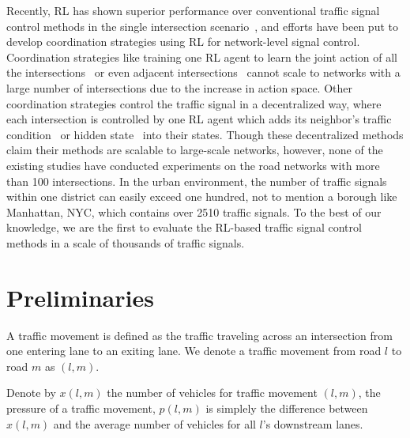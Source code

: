 Recently, RL has shown superior performance over conventional traffic signal control methods in the single intersection scenario~\cite{van2016coordinated,wei2018intellilight}, and efforts have been put to develop coordination strategies using RL for network-level signal control. Coordination strategies like training one RL agent to learn the joint action of all the intersections~\cite{PraB11} or even adjacent intersections~\cite{KWBV08,van2016coordinated} cannot scale to networks with a large number of intersections due to the increase in action space. Other coordination strategies control the traffic signal in a  decentralized way, where each intersection is controlled by one RL agent which adds its neighbor’s traffic condition~\cite{ElAb12,arel2010reinforcement,SBPB+06,EAA13,DrSt06,Wier00,WVVK04-2}  or hidden state~\cite{nishi2018traffic} into their states. Though these decentralized methods claim their methods are scalable to large-scale networks, however, none of the existing studies have conducted experiments on the road networks with more than 100 intersections. In the urban environment, the number of traffic signals within one district can easily exceed one hundred, not to mention a borough like Manhattan, NYC, which contains over 2510 traffic signals. To the best of our knowledge, we are the first to evaluate the RL-based traffic signal control methods in a scale of thousands of traffic signals.


\section{Preliminaries}
 
\begin{definition}
A traffic movement is defined as the traffic traveling across an intersection from one entering lane to an exiting lane. We denote a traffic movement from road $l$ to road $m$ as $(l,m)$. 
\end{definition}

\begin{definition}
Denote by $x(l,m)$ the number of vehicles for traffic movement $(l,m)$, the pressure of a traffic movement, $p(l,m)$ is simplely the difference between $x(l,m)$ and the average number of vehicles for all $l$'s downstream lanes.
    \end{definition}


